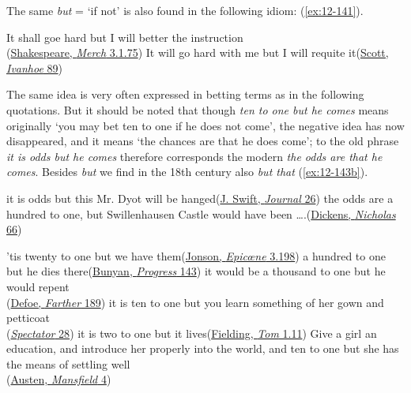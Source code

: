 The same \textit{but} = `if not' is also found in the following idiom: (\ref{ex:12-141}).

\ea \label{ex:12-141}
\ea
It shall goe hard but I will better the instruction\\\hfill(\href{https://internetshakespeare.uvic.ca/doc/MV_F1/scene/3.1/index.html#tln-1280}{Shakespeare, \textit{Merch} 3.1.75})
\ex
It will go hard with me but I will requite it\hfill(\href{https://archive.org/details/scottsivanhoeedi0000amar/page/80/mode/2up?q=%22will+go+hard+with%22&view=theater}{Scott, \textit{Ivanhoe} 89})
\z
\z

The same idea is very often expressed in betting terms as in the following quotations. But it should be noted that though \textit{ten to one but he comes} means originally `you may bet ten to one if he does not come', the negative idea has now disappeared, and it means `the chances are that he does come'; to the old phrase \textit{it is odds but he comes} therefore corresponds the modern \textit{the odds are that he comes}. Besides \textit{but} we find in the 18th century also \textit{but that} (\ref{ex:12-143b}).

\ea \label{ex:12-143}
\ea
it is odds but this Mr. Dyot will be hanged\hfill(\href{https://archive.org/details/journaltostellae00swifuoft/page/26/mode/2up?q=%22it+is+odds+but%22&view=theater}{J. Swift, \textit{Journal} 26})
\ex
the odds are a hundred to one, but Swillenhausen Castle would have been {\dots}.\hfill(\href{https://archive.org/details/lifeadventuresofdickrich/page/76/mode/2up?q=%22odds+are+a+hundred%22&view=theater}{Dickens, \textit{Nicholas} 66}) %
\z
\z

\ea \label{ex:12-143a}
\ea
'tis twenty to one but we have them\hfill(\href{https://archive.org/details/in.ernet.dli.2015.46505/page/n37/mode/2up?q=%22twenty+to+one%22&view=theater}{Jonson, \textit{Epicœne} 3.198})
\ex
a hundred to one but he dies there\hfill(\href{https://archive.org/details/bunyanspilgrims00moffgoog/page/142/mode/2up?q=%22hundred+to+one+but%22&view=theater}{Bunyan, \textit{Progress} 143})
\ex
it would be a thousand to one but he would repent\\\hfill(\href{https://archive.org/details/fartheradventure00defo/page/174/mode/2up?q=%22it+would+be%22+&view=theater}{Defoe, \textit{Farther} 189})
\ex
it is ten to one but you learn something of her gown and petticoat\\\hfill(\href{https://archive.org/details/spectatornewedre00addiuoft/page/28/mode/2up?q=%22ten+to+one+but+you+learn%22&view=theater}{\textit{Spectator} 28}) %
\ex
it is two to one but it lives\hfill(\href{https://archive.org/details/bim_eighteenth-century_the-history-of-tom-jones_fielding-henry_1750_1_0/page/10/mode/2up?q=%22it+is+two+to+one%22&view=theater}{Fielding, \textit{Tom} 1.11})
\ex
Give a girl an education, and introduce her properly into the world, and ten to one but she has the means of settling well\\\hfill(\href{https://archive.org/details/mansfieldpark00aust_1/page/4/mode/2up?q=%22girl+an+education%22&view=theater}{Austen, \textit{Mansfield} 4})
\z
\z

